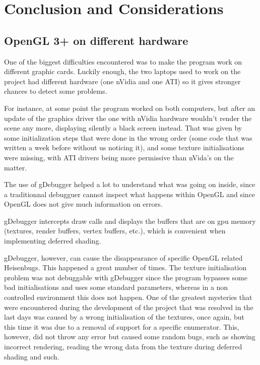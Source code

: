 \chapter{Conclusion and Considerations}

\section{OpenGL 3+ on different hardware}

One of the biggest difficulties encountered was to make the program work on
different graphic cards. Luckily enough, the two laptops used to work on the project had different
hardware (one nVidia and one ATI) so it gives stronger chances to detect some problems.
 
For instance, at some point the program worked on both computers, but after an update
of the graphics driver the one with nVidia hardware wouldn't render the scene any more, displaying
silently a black screen instead. That was given by some initialization steps that were
done in the wrong order (some code that was written a week before without us noticing it),
and some texture initialisations were missing, with ATI drivers being more permissive than nVida's on
the matter.

The use of gDebugger helped a lot to understand what was going on inside,
since a traditionnal debugguer cannot inspect what happens within OpenGL and since OpenGL
does not give much information on errors.

gDebugger intercepts draw calls and displays the buffers that are
on gpu memory (textures, render buffers, vertex buffers, etc.), which is convenient
when implementing deferred shading.

gDebugger, however, can cause the disappearance of specific OpenGL related Heisenbugs. This
happened a great number of times. The texture initialisation problem was not debuggable
with gDebugger since the program bypasses some bad initialisations and uses some standard
parameters, whereas in a non controlled environment this does not happen. One of the
greatest mysteries that were encountered during the development of the project that was
resolved in the last days was caused by a wrong initialisation of the textures, once again,
but this time it was due to a removal of support for a specific enumerator. This, however,
did not throw any error but caused some random bugs, such as showing incorrect rendering,
reading the wrong data from the texture during deferred shading and such.

